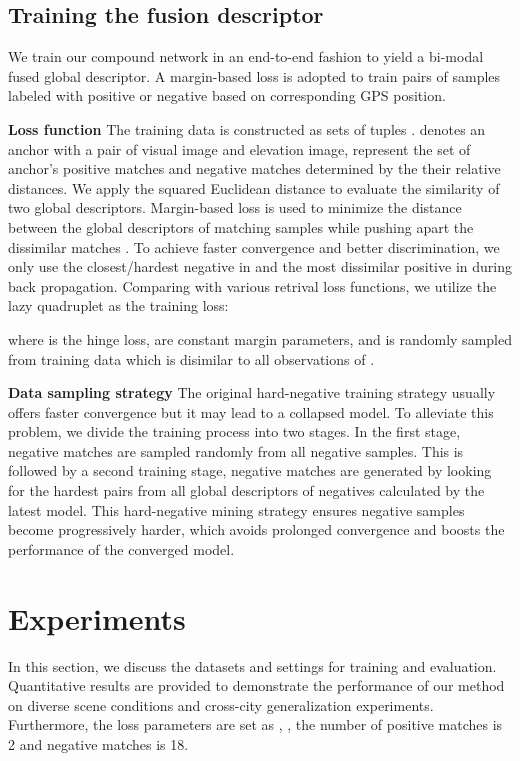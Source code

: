 \documentclass[letterpaper, 10 pt, conference]{ieeeconf}  \usepackage{tabularx}
\begin{document}
\subsection{Training the fusion descriptor}

We train our compound network in an end-to-end fashion to yield a bi-modal fused global descriptor. A margin-based loss is adopted to train pairs of samples labeled with positive or negative based on corresponding GPS position.

\textbf{Loss function} The training data is constructed as sets of tuples .  denotes an anchor with a pair of visual image and elevation image,  represent the set of anchor's positive matches and negative matches determined by the their relative distances. We apply the squared Euclidean distance  to evaluate the similarity of two global descriptors. Margin-based loss is used to minimize the distance  between the global descriptors of matching samples  while pushing apart the dissimilar matches . To achieve faster convergence and better discrimination, we only use the closest/hardest negative  in  and the most dissimilar positive  in  during back propagation. Comparing with various retrival loss functions, we utilize the lazy quadruplet \cite{chen2017beyond} as the training loss:

where  is the hinge loss,  are constant margin parameters, and  is randomly sampled from training data which is disimilar to all observations of .

\textbf{Data sampling strategy} The original hard-negative training strategy usually offers faster convergence but it may lead to a collapsed model. To alleviate this problem, we divide the training process into two stages. In the first stage, negative matches  are sampled randomly from all negative samples. This is followed by a second training stage, negative matches  are generated by looking for the hardest pairs from all global descriptors of negatives calculated by the latest model. This hard-negative mining strategy ensures negative samples become progressively harder, which avoids prolonged convergence and boosts the performance of the converged model.

\section{Experiments}

In this section, we discuss the datasets and settings for training and evaluation. Quantitative results are provided to demonstrate the performance of our method on diverse scene conditions and cross-city generalization experiments. Furthermore, the loss parameters are set as , , the number of positive matches  is 2 and negative matches  is 18.
\end{document}
